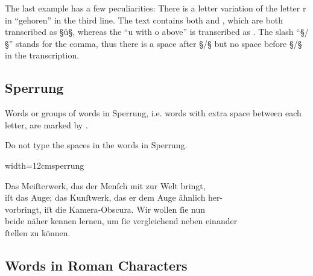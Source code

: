 \begin{note}
The last example has a few peculiarities: There is a letter variation of the letter r in “gehoren” in the third line. The text contains both  and , which are both transcribed as §ü§, whereas the “u with o above” is transcribed as . The slash “§/§” stands for the comma, thus there is a space after §/§ but no space before §/§ in the transcription.
\end{note}



\tocspace
\subsection{Sperrung}
\label{section sperrung}

\begin{mainrule}
Words or groups of words in Sperrung, i.e. words with extra space between each letter, are marked by .
\end{mainrule}

\begin{clarification}
Do not type the spaces in the words in Sperrung.
\end{clarification}

\vspace{3mm}
\begin{sampleImageSmall}{width=12cm}{sperrung}
\begin{typeLatin}
Das Meiſterwerk, das der Menſch mit zur Welt bringt,  \\
iſt das Auge; das Kunſtwerk, das er dem Auge ähnlich her-  \\
vorbringt, iſt die Kamera-Obscura. Wir wollen ſie nun  \\
beide näher kennen lernen, um ſie vergleichend neben einander  \\
ſtellen zu können.
\end{typeLatin}
\end{sampleImageSmall}

\tocspace
\subsection{Words in Roman Characters}
\label{section words in roman characters}

